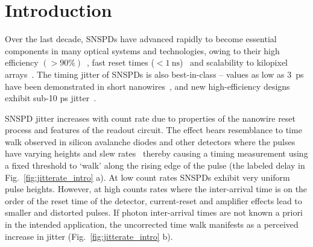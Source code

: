 \documentclass[11pt]{caltech_thesis} %
\begin{document}
\hypertarget{introduction-2}{%
\section{Introduction}\label{introduction-2}}

Over the last decade, SNSPDs have advanced rapidly to become essential components in many optical systems and technologies, owing to their high efficiency $(>90\%)$~\autocite{99.5_Chang_2021,reddy2020superconducting}, fast reset times ($< 1~\mathrm{ns}$)~\autocite{Vetter2016Cavity} and scalability to kilopixel arrays~\autocite{Wollman2019}. The timing jitter of SNSPDs is also best-in-class -- values as low as 3~ps have been demonstrated in short nanowires~\autocite{Korzh2020}, and new high-efficiency designs exhibit sub-10 ps jitter~\autocite{EsmaeilZadeh2020,Colangelo2021}.

SNSPD jitter increases with count rate due to properties of the nanowire reset process and features of the readout circuit. The effect bears resemblance to time walk observed in silicon avalanche diodes and other detectors where the pulses have varying heights and slew rates~\autocite{SPAD_walk_Kirchnir_1997} thereby causing a timing measurement using a fixed threshold to `walk' along the rising edge of the pulse (the labeled delay in Fig.~\ref{fig:jitterate_intro} a).
At low count rates SNSPDs exhibit very uniform pulse heights. However, at high counts rates where the inter-arrival time is on the order of the reset time of the detector, current-reset and amplifier effects lead to smaller and distorted pulses. If photon inter-arrival times are not known a priori in the intended application, the uncorrected time walk manifests as a perceived increase in jitter (Fig.~\ref{fig:jitterate_intro} b).
\end{document}
